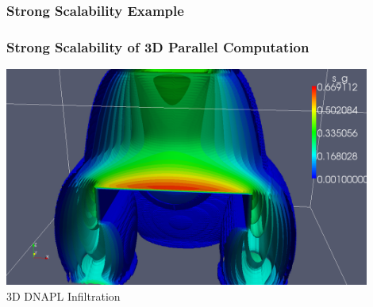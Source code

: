 \subsubsection{Strong Scalability Example}
\begin{frame}
\frametitle<presentation>{Strong Scalability of 3D Parallel Computation}
\begin{center}
\includegraphics[width=0.9\textwidth]{EPS/dnapl-3d-het-iso}\\
3D DNAPL Infiltration
\end{center}
\end{frame}


